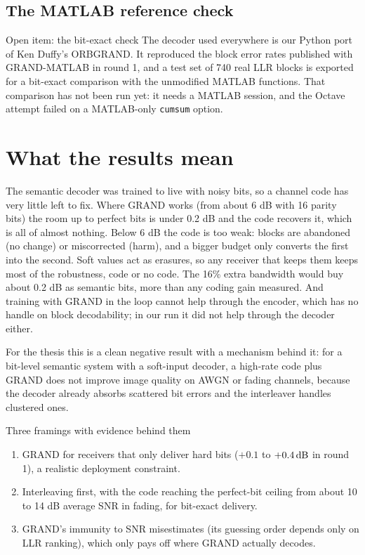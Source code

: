 \documentclass{article}
\begin{document}
\subsection{The MATLAB reference check}

\begin{warningbox}{Open item: the bit-exact check}
The decoder used everywhere is our Python port of Ken Duffy's ORBGRAND. It reproduced the block error
rates published with GRAND-MATLAB in round 1, and a test set of 740 real LLR blocks is exported for a
bit-exact comparison with the unmodified MATLAB functions. That comparison has not been run yet: it
needs a MATLAB session, and the Octave attempt failed on a MATLAB-only \texttt{cumsum} option.
\end{warningbox}

\section{What the results mean}

The semantic decoder was trained to live with noisy bits, so a channel code has very little left to
fix. Where GRAND works (from about 6 dB with 16 parity bits) the room up to perfect bits is under 0.2 dB
and the code recovers it, which is all of almost nothing. Below 6 dB the code is too weak: blocks are
abandoned (no change) or miscorrected (harm), and a bigger budget only converts the first into the
second. Soft values act as erasures, so any receiver that keeps them keeps most of the robustness, code
or no code. The 16\% extra bandwidth would buy about 0.2 dB as semantic bits, more than any coding gain
measured. And training with GRAND in the loop cannot help through the encoder, which has no handle on
block decodability; in our run it did not help through the decoder either.

For the thesis this is a clean negative result with a mechanism behind it: for a bit-level semantic
system with a soft-input decoder, a high-rate code plus GRAND does not improve image quality on AWGN or
fading channels, because the decoder already absorbs scattered bit errors and the interleaver handles
clustered ones.

\begin{findingbox}{Three framings with evidence behind them}
\begin{enumerate}
\item GRAND for receivers that only deliver hard bits ($+0.1$ to $+0.4\,\mathrm{dB}$ in round 1), a realistic
deployment constraint.
\item Interleaving first, with the code reaching the perfect-bit ceiling from about 10 to 14 dB
average SNR in fading, for bit-exact delivery.
\item GRAND's immunity to SNR misestimates (its guessing order depends only on LLR ranking), which only
pays off where GRAND actually decodes.
\end{enumerate}
\end{findingbox}
\end{document}
